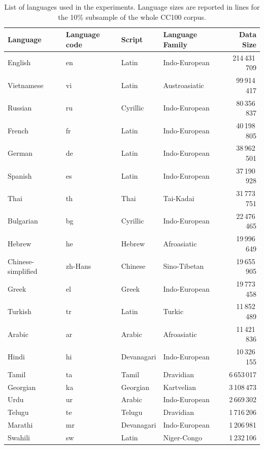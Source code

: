 \begin{table}[h]
    \centering\footnotesize\sf
    \begin{tabular}{llllr}
    \toprule
    Language & Language code & Script & Language Family & Data Size \\
    \midrule
    English & en & Latin & Indo-European & 214\,431\,709 \\
    Vietnamese & vi & Latin & Austroasiatic & 99\,914\,417 \\
    Russian & ru & Cyrillic & Indo-European & 80\,356\,837 \\
    French & fr & Latin & Indo-European & 40\,198\,805 \\
    German & de & Latin & Indo-European & 38\,962\,501 \\
    Spanish & es & Latin & Indo-European & 37\,190\,928 \\
    Thai & th & Thai & Tai-Kadai & 31\,773\,751 \\
    Bulgarian & bg & Cyrillic & Indo-European & 22\,476\,465 \\
    Hebrew & he & Hebrew & Afroasiatic & 19\,996\,649 \\
    Chinese-simplified & zh-Hans & Chinese & Sino-Tibetan & 19\,655\,905 \\
    Greek & el & Greek & Indo-European & 19\,773\,458 \\
    Turkish & tr & Latin & Turkic & 11\,852\,489 \\
    Arabic & ar & Arabic & Afroasiatic & 11\,421\,836 \\
    Hindi & hi & Devanagari & Indo-European & 10\,326\,155 \\
    Tamil & ta & Tamil & Dravidian & 6\,653\,017 \\
    Georgian & ka & Georgian & Kartvelian & 3\,108\,473 \\
    Urdu & ur & Arabic & Indo-European & 2\,669\,302 \\
    Telugu & te & Telugu & Dravidian & 1\,716\,206 \\
    Marathi & mr & Devanagari & Indo-European & 1\,206\,981 \\
    Swahili & sw & Latin & Niger-Congo & 1\,232\,106 \\
    \bottomrule
    \end{tabular}
    \caption{List of languages used in the experiments. Language sizes are reported in lines for the 10\% subsample of the whole CC100 corpus.}
    \label{tab:languages}
\end{table}


